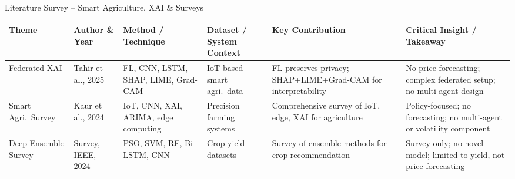 \documentclass{beamer}
\begin{document}
\begin{frame}[label=lit_xai]{Literature Survey -- Smart Agriculture, XAI \& Surveys}
\setlength{\tabcolsep}{2pt}
\renewcommand{\arraystretch}{1.3}
\tiny

\begin{tcolorbox}[enhanced, colback=white, colframe=accentred!40, arc=4pt, boxrule=0.3pt,
  left=1pt, right=1pt, top=2pt, bottom=2pt, shadow={1pt}{-1pt}{0pt}{black!10}]
\begin{adjustbox}{max width=\textwidth}
\begin{tabular}{|L{1.5cm}|L{1.4cm}|L{1.6cm}|L{1.8cm}|L{2.0cm}|L{2.3cm}|}
\hline
{}
\textbf{Theme} & \textbf{Author \& Year} & \textbf{Method / Technique} & \textbf{Dataset / System Context} & \textbf{Key Contribution} & \textbf{Critical Insight / Takeaway} \\
\hline
Federated XAI & Tahir et al., 2025 & FL, CNN, LSTM, SHAP, LIME, Grad-CAM & IoT-based smart agri.\ data & FL preserves privacy; SHAP+LIME+Grad-CAM for interpretability & No price forecasting; complex federated setup; no multi-agent design \\ \hline
Smart Agri.\ Survey & Kaur et al., 2024 & IoT, CNN, XAI, ARIMA, edge computing & Precision farming systems & Comprehensive survey of IoT, edge, XAI for agriculture & Policy-focused; no forecasting; no multi-agent or volatility component \\ \hline
Deep Ensemble Survey & Survey, IEEE, 2024 & PSO, SVM, RF, Bi-LSTM, CNN & Crop yield datasets & Survey of ensemble methods for crop recommendation & Survey only; no novel model; limited to yield, not price forecasting \\ \hline
\end{tabular}
\end{adjustbox}
\end{tcolorbox}

\end{frame}
\end{document}
